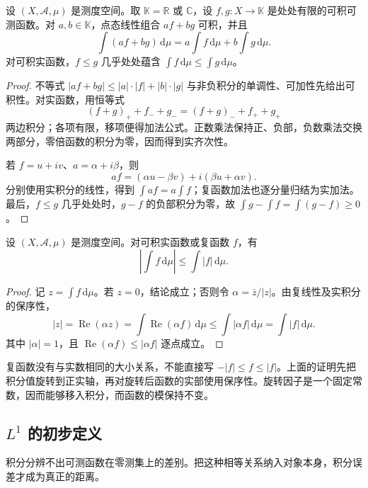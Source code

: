 \begin{proposition}\label{b1:prop:integrable-linearity}
设 \((X,\mathcal A,\mu)\) 是测度空间。取 \(\mathbb K=\mathbb R\) 或 \(\mathbb C\)，设 \(f,g:X\rightarrow\mathbb K\) 是处处有限的可积可测函数。对 \(a,b\in\mathbb K\)，点态线性组合 \(af+bg\) 可积，并且
\[
\int(af+bg)\,\mathrm d\mu
=a\int f\,\mathrm d\mu+b\int g\,\mathrm d\mu.
\]
对可积实函数，\(f\leq g\) 几乎处处蕴含 \(\int f\,\mathrm d\mu\leq\int g\,\mathrm d\mu\)。
\end{proposition}
\begin{proof}
不等式 \(|af+bg|\leq|a|\cdot|f|+|b|\cdot|g|\) 与非负积分的单调性、可加性先给出可积性。对实函数，用恒等式
\[
(f+g)_++f_-+g_-=(f+g)_-+f_++g_+
\]
两边积分；各项有限，移项便得加法公式。正数乘法保持正、负部，负数乘法交换两部分，零倍函数的积分为零，因而得到实齐次性。

若 \(f=u+iv\)、\(a=\alpha+i\beta\)，则
\[
af=(\alpha u-\beta v)+i(\beta u+\alpha v).
\]
分别使用实积分的线性，得到 \(\int af=a\int f\)；复函数加法也逐分量归结为实加法。最后，\(f\leq g\) 几乎处处时，\(g-f\) 的负部积分为零，故 \(\int g-\int f=\int(g-f)\geq0\)。
\end{proof}

\begin{proposition}\label{b1:prop:integral-triangle}
设 \((X,\mathcal A,\mu)\) 是测度空间。对可积实函数或复函数 \(f\)，有
\[
\left|\int f\,\mathrm d\mu\right|\leq\int|f|\,\mathrm d\mu.
\]
\end{proposition}
\begin{proof}
记 \(z=\int f\,\mathrm d\mu\)。若 \(z=0\)，结论成立；否则令 \(\alpha=\overline z/|z|\)。由复线性及实积分的保序性，
\[
|z|=\operatorname{Re}(\alpha z)
=\int\operatorname{Re}(\alpha f)\,\mathrm d\mu
\leq\int|\alpha f|\,\mathrm d\mu
=\int|f|\,\mathrm d\mu.
\]
其中 \(|\alpha|=1\)，且 \(\operatorname{Re}(\alpha f)\leq|\alpha f|\) 逐点成立。
\end{proof}

复函数没有与实数相同的大小关系，不能直接写 \(-|f|\leq f\leq|f|\)。上面的证明先把积分值旋转到正实轴，再对旋转后函数的实部使用保序性。旋转因子是一个固定常数，因而能够移入积分，而函数的模保持不变。

\subsection{\texorpdfstring{\(L^1\)}{L1} 的初步定义}
\label{b1:subsec:050203}

积分分辨不出可测函数在零测集上的差别。把这种相等关系纳入对象本身，积分误差才成为真正的距离。

